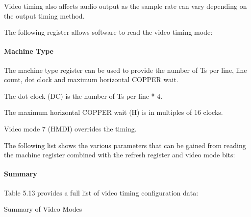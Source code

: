 Video timing also affects audio output as the sample rate can vary
depending on the output timing method.

The following register allows software to read the video timing mode:



\paragraph{Machine Type}

The machine type register can be used to provide the number of Ts per
line, line count, dot clock and maximum horizontal COPPER wait.

The dot clock (DC) is the number of Ts per line * 4.

The maximum horizontal COPPER wait (H) is in multiples of 16 clocks.

Video mode 7 (HMDI) overrides the timing.

The following list shows the various parameters that can be gained
from reading the machine register combined with the refresh register
and video mode bits:


      
\paragraph{Summary}

Table 5.13 provides a full list of video timing configuration
data:

\begin{table}[ht]\centering
  \caption{Summary of Video Modes}
\end{table}




